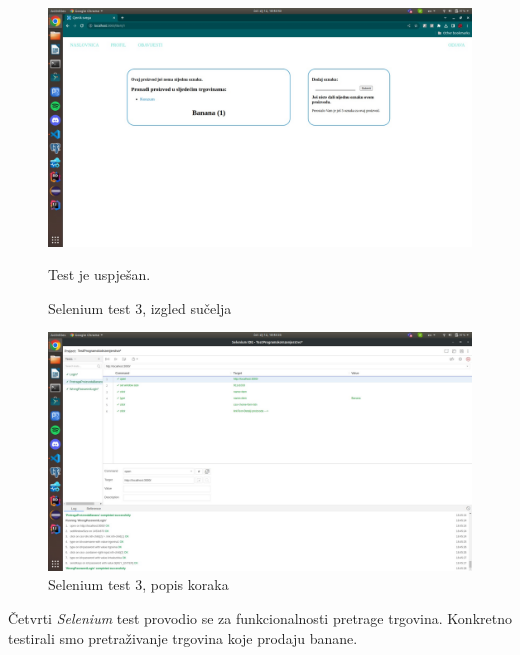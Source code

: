 			\begin{figure}[H]
			\includegraphics[width=\textwidth]{slike/sel3a.jpeg} %
			\caption{Selenium test 3, izgled sučelja}
			\label{fig:sel3a} %
			Test je uspješan.
			
			\end{figure}
			\begin{figure}[H]
			\includegraphics[width=\textwidth]{slike/sel3b.jpeg} %
			\caption{Selenium test 3, popis koraka}
			\label{fig:sel3b} %
			\end{figure}
			
			Četvrti \textit{Selenium} test provodio se za funkcionalnosti pretrage trgovina. Konkretno testirali smo pretraživanje trgovina koje prodaju banane.
			
